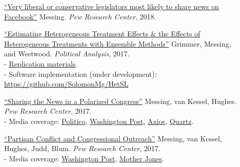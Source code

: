 \documentclass[letterpaper,11pt]{article}
\begin{document}
\begin{description}
\item[] \href{https://www.pewresearch.org/fact-tank/2018/01/19/very-liberal-or-conservative-legislators-most-likely-to-share-news-on-facebook//}{``Very liberal or conservative legislators most likely to share news on Facebook''} Messing. 
\emph{Pew Research Center}, 2018.  \\

\item[] \href{https://pages.shanti.virginia.edu/PolMeth/files/2013/07/GrimmerMessingWestwood.pdf}{``Estimating Heterogeneous Treatment Effects \& the Effects of Heterogeneous Treatments with Ensemble Methods''} Grimmer, Messing, and Westwood.
\emph{Political Analysis}, 2017. \\
- \href{http://dx.doi.org/10.7910/DVN/BQMLQW}{Replication materials}. \\
- Software implementation (under development): \url{https://github.com/SolomonMg/HetSL}

\item[] \href{https://www.people-press.org/2017/12/18/sharing-the-news-in-a-polarized-congress/}{``Sharing the News in a Polarized Congress''} Messing, van Kessel, Hughes. 
\emph{Pew Research Center}, 2017.  \\
- Media coverage: \href{https://www.politico.com/story/2017/12/18/pew-study-social-media-political-polarization-302252}{Politico}, \href{https://www.washingtonpost.com/news/politics/wp/2017/12/18/how-politicians-use-of-social-media-is-reinforcing-a-partisan-media-divide/}{Washington Post}, \href{https://www.axios.com/democrats-are-angrier-than-republicans-on-facebook-1515110686-ba65f9e2-10c3-4b06-b31f-4588fbca9573.html}{Axios}, \href{https://qz.com/1161816/facebook-and-politics-reactions-to-posts-by-democrats-got-a-lot-angrier-after-trump-was-elected/}{Quartz}.

\item[] \href{http://www.people-press.org/2017/02/23/partisan-conflict-and-congressional-outreach/}{``Partisan Conflict and Congressional Outreach''} Messing, van Kessel, Hughes, Judd, Blum. 
\emph{Pew Research Center}, 2017.  \\
- Media coverage: \href{https://www.washingtonpost.com/news/wonk/wp/2017/02/23/republican-lawmakers-go-negative-more-often-than-democrats-according-to-a-first-of-its-kind-analysis/}{Washington Post}, \href{http://www.motherjones.com/kevin-drum/2017/02/pew-republicans-disagree-and-they-disagree-indignantly/}{Mother Jones}.


\end{description}
\end{document}
